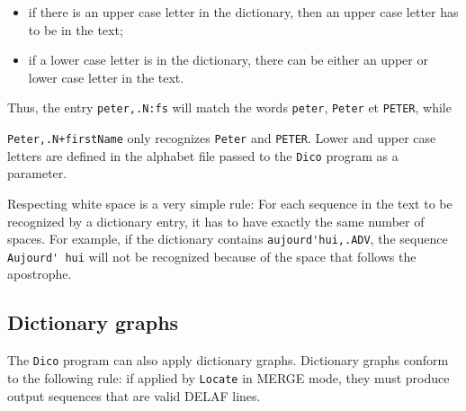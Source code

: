 \begin{itemize}
  \item if there is an upper case letter in the dictionary, then an upper case
  letter has to be in the text;
  
  \item if a lower case letter is in the dictionary, there can be either an upper
  or lower case letter in the text.
\end{itemize}

\bigskip
\noindent Thus, the entry \verb$peter,.N:fs$ will match the words \verb+peter+,
\verb+Peter+ et \verb+PETER+, while

\noindent \verb$Peter,.N+firstName$ only 
recognizes \verb+Peter+ and \verb+PETER+. Lower and upper case
letters are defined in the alphabet file passed to the \verb+Dico+ program
 as a parameter.

\bigskip
\noindent Respecting white space is a very simple rule: For each sequence in the text to be
recognized by a dictionary entry, it has to have exactly the same number of
spaces. For example, if the dictionary contains \verb+aujourd'hui,.ADV+, the
sequence \verb+Aujourd' hui+ will not be recognized because of the space that
follows the apostrophe.


\subsection{Dictionary graphs}
\label{section-dictionary-graphs}
The \verb+Dico+ program
can also apply dictionary graphs. Dictionary graphs conform to the following
rule: if applied by \verb+Locate+ in MERGE mode,
they must produce output sequences that are valid DELAF lines.

